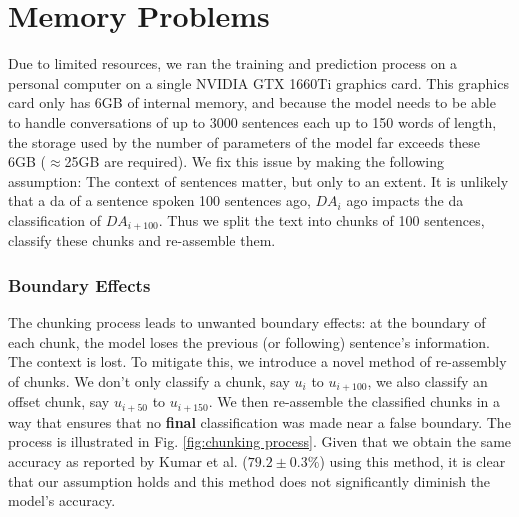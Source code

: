     \section{Memory Problems}
        Due to limited resources, we ran the training and prediction process on a personal computer on a single NVIDIA GTX 1660Ti graphics card. This graphics card only has 6GB of internal memory, and because the \gls{model} needs to be able to handle conversations of up to 3000 sentences each up to 150 words of length, the storage used by the number of parameters of the \gls{model} far exceeds these 6GB ($\approx$25GB are required). We fix this issue by making the following assumption: The context of sentences matter, but only to an extent. It is unlikely that a \gls{da} of a sentence spoken 100 sentences ago, $DA_{i}$ ago impacts the \gls{da} classification of  $DA_{i + 100}$. Thus we split the text into chunks of 100 sentences, classify these chunks and re-assemble them.

        \subsubsection{Boundary Effects}
            The chunking process leads to unwanted boundary effects: at the boundary of each chunk, the \gls{model} loses the previous (or following) sentence's information. The context is lost. To mitigate this, we introduce a novel method of re-assembly of chunks. We don't only classify a chunk, say $u_{i}$ to $u_{i + 100}$, we also classify an offset chunk, say $u_{i + 50}$ to $u_{i + 150}$. We then re-assemble the classified chunks in a way that ensures that no \textbf{final} classification was made near a false boundary. The process is illustrated in Fig. \ref{fig:chunking process}. Given that we obtain the same accuracy as reported by Kumar et al. ($79.2 \pm 0.3\%$)\cite{kumar2017dialogue} using this method, it is clear that our assumption holds and this method does not significantly diminish the \gls{model}'s accuracy.

